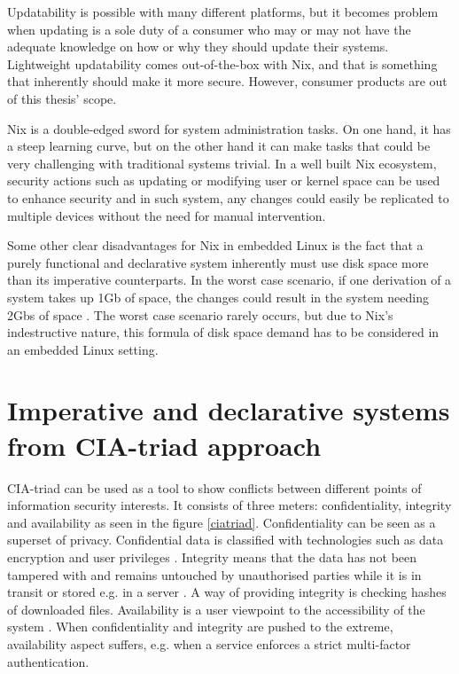 Updatability is possible with many different platforms, but it  becomes
problem when updating is a sole duty of a consumer who may or may not
have the adequate knowledge on how or why they should update their
systems. Lightweight updatability comes out-of-the-box with Nix, and
that is something that inherently should make it more secure. However, consumer
products are out of this thesis' scope.

Nix is a double-edged sword for system administration tasks. On one
hand, it has a steep learning curve, but on the other hand it can make
tasks that could be very challenging with traditional systems
trivial. In a well built Nix ecosystem, security actions such as
updating or modifying user or kernel space can be used to enhance
security and in such system, any changes could easily be replicated to
multiple devices without the need for manual intervention.

Some other clear disadvantages for Nix in embedded Linux is the fact
that a purely functional and declarative system inherently must use disk
space more than its imperative counterparts. In the worst case
scenario, if one derivation of a system takes up 1Gb of space, the changes could result in the system needing 2Gbs of space \cite{dolstra2007purely}. The
worst case scenario rarely occurs, but due to Nix's indestructive
nature, this formula of disk space demand has to be considered in an
embedded Linux setting. 

\section{Imperative and declarative systems from CIA-triad approach} \label{imperativeanddeclarative}

CIA-triad can be used as a tool to show conflicts between different
points of information security interests. It consists of three meters:
confidentiality, integrity and availability as seen in the figure
\ref{ciatriad}. Confidentiality can be seen as a superset of
privacy. Confidential data is classified with technologies such as
data encryption and user privileges \cite{pender2019parkerian}. Integrity means that the data has
not been tampered with and remains untouched by unauthorised parties
while it is in transit or stored e.g. in a server \cite{pender2019parkerian}. A way of providing
integrity is checking hashes of downloaded files. Availability is a
user viewpoint to the accessibility of the system \cite{pender2019parkerian}. When
confidentiality and integrity are pushed to the extreme, availability
aspect suffers, e.g. when a service enforces a strict multi-factor
authentication. 


